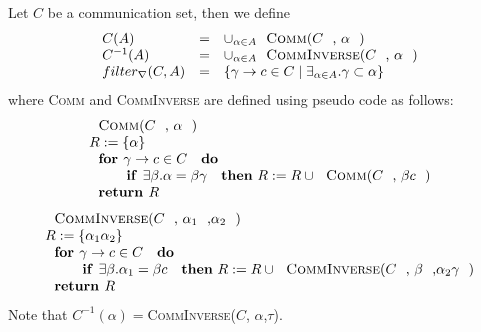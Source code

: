 \documentclass{article}
\begin{document}
Let $C$ be a communication set, then we define%
\[
\begin{array}{lll}
C(A) & = & \cup _{\alpha \in A}\text{\textsc{Comm}(}C\text{, }\alpha \text{)}
\\ 
C^{-1}(A) & = & \cup _{\alpha \in A}\text{\textsc{CommInverse}(}C\text{, }%
\alpha \text{)} \\ 
filter_{\nabla }(C,A) & = & \{\gamma \rightarrow c\in C\mid \exists _{\alpha
\in A}.\gamma \subset \alpha \}%
\end{array}%
\]%
where \textsc{Comm} and \textsc{CommInverse} are defined using pseudo code
as follows:%
\[
\begin{array}{l}
\text{\textsc{Comm}(}C\text{, }\alpha \text{)} \\ 
R:=\{\alpha \} \\ 
\text{\textbf{for }}\gamma \rightarrow c\in C\text{ \textbf{do}} \\ 
\qquad \text{\textbf{if }}\exists \beta .\alpha =\beta \gamma \text{ \textbf{%
then} }R:=R\cup \text{\textsc{Comm}(}C\text{, }\beta c\text{)} \\ 
\text{\textbf{return }}R%
\end{array}%
\]%
\[
\begin{array}{l}
\text{\textsc{CommInverse}(}C\text{, }\alpha _{1}\text{,}\alpha _{2}\text{)}
\\ 
R:=\{\alpha _{1}\alpha _{2}\} \\ 
\text{\textbf{for }}\gamma \rightarrow c\in C\text{ \textbf{do}} \\ 
\qquad \text{\textbf{if }}\exists \beta .\alpha _{1}=\beta c\text{ \textbf{%
then} }R:=R\cup \text{\textsc{CommInverse}(}C\text{, }\beta \text{,}\alpha
_{2}\gamma \text{)} \\ 
\text{\textbf{return }}R%
\end{array}%
\]%
Note that $C^{-1}(\alpha )=$\textsc{CommInverse}($C$, $\alpha $,$\tau $).
\end{document}

